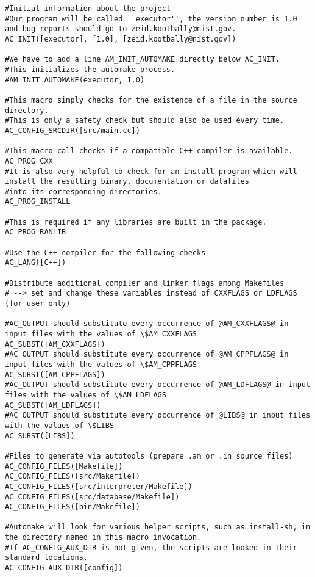 \begin{minipage}{.5\paperwidth}
\begin{mylisting}
\begin{Verbatim}[commandchars=\\\{\},fontsize=\scriptsize, numbersep=2pt]
#Initial information about the project
#Our program will be called ``executor'', the version number is 1.0 and bug-reports should go to zeid.kootbally@nist.gov.
AC_INIT([executor], [1.0], [zeid.kootbally@nist.gov])

#We have to add a line AM_INIT_AUTOMAKE directly below AC_INIT.
#This initializes the automake process.
#AM_INIT_AUTOMAKE(executor, 1.0)

#This macro simply checks for the existence of a file in the source directory.
#This is only a safety check but should also be used every time.
AC_CONFIG_SRCDIR([src/main.cc])

#This macro call checks if a compatible C++ compiler is available.
AC_PROG_CXX
#It is also very helpful to check for an install program which will install the resulting binary, documentation or datafiles
#into its corresponding directories.
AC_PROG_INSTALL

#This is required if any libraries are built in the package.
AC_PROG_RANLIB

#Use the C++ compiler for the following checks
AC_LANG([C++])

#Distribute additional compiler and linker flags among Makefiles
# --> set and change these variables instead of CXXFLAGS or LDFLAGS (for user only)

#AC_OUTPUT should substitute every occurrence of @AM_CXXFLAGS@ in input files with the values of \$AM_CXXFLAGS
AC_SUBST([AM_CXXFLAGS])
#AC_OUTPUT should substitute every occurrence of @AM_CPPFLAGS@ in input files with the values of \$AM_CPPFLAGS
AC_SUBST([AM_CPPFLAGS])
#AC_OUTPUT should substitute every occurrence of @AM_LDFLAGS@ in input files with the values of \$AM_LDFLAGS
AC_SUBST([AM_LDFLAGS])
#AC_OUTPUT should substitute every occurrence of @LIBS@ in input files with the values of \$LIBS
AC_SUBST([LIBS])

#Files to generate via autotools (prepare .am or .in source files)
AC_CONFIG_FILES([Makefile])
AC_CONFIG_FILES([src/Makefile])
AC_CONFIG_FILES([src/interpreter/Makefile])
AC_CONFIG_FILES([src/database/Makefile])
AC_CONFIG_FILES([bin/Makefile])

#Automake will look for various helper scripts, such as install-sh, in the directory named in this macro invocation.
#If AC_CONFIG_AUX_DIR is not given, the scripts are looked in their standard locations.
AC_CONFIG_AUX_DIR([config])


\end{Verbatim}
\end{mylisting}
\end{minipage}
